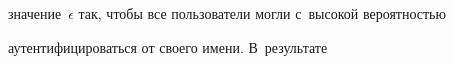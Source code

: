 значение~$\epsilon$ так, чтобы все пользователи могли с~высокой вероятностью 


аутентифицироваться от своего имени. В~результате\linebreak\vspace*{-12pt}





\pagebreak





\





\vspace*{-12pt}





\renewcommand{\figurename}{\protect\bf Таблица}







\setcounter{figure}{1}







